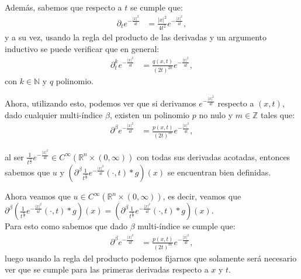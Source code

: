 \documentclass{beamer}
\begin{document}
\begin{frame}
  \begin{block}{}
    Además, sabemos que respecto a $t$ se cumple que:
    \begin{align*}
      \partial_{t}e^{-\frac{|x|^2}{4t}}& = \frac{|x|^{2}}{4t^2} e^{-\frac{|x|^2}{4t}},
    \end{align*}
    y a su vez, usando la regla del producto de las derivadas y un argumento inductivo se puede verificar que en general:
    \begin{align*}
      \partial^{k}_{t}e^{-\frac{|x|^2}{4t}}&=\frac{q(x,t)}{(2t)^{2k}}e^{-\frac{|x|^2}{4t}},
    \end{align*}
    con $k\in \mathbb{N}$ y $q$ polinomio.\\
  \end{block}
\end{frame}

\begin{frame}
  \begin{block}{}
    Ahora, utilizando esto, podemos ver que si derivamos $e^{-\frac{|x|^2}{4t}}$ respecto a $(x,t)$, dado cualquier multi-índice $\beta$, existen un polinomio $p$ no nulo y $m\in \mathbb{Z}$ tales que:
    \begin{align*}
      \partial^{\beta}e^{-\frac{|x|^2}{4t}}&=\frac{p(x,t)}{(2t)^m}e^{-\frac{|x|^2}{4t}},
    \end{align*}
  \end{block}
\end{frame}

\begin{frame}
  \begin{block}{}
    al ser $\frac{1}{t^{\frac{n}{2}}}e^{-\frac{|x|^2}{4t}}\in C^{\infty}(\mathbb{R}^{n}\times(0,\infty))$ con todas sus derivadas acotadas, entonces sabemos que $u$ y $\left( \partial^{\beta}\frac{1}{t^{\frac{n}{2}}}e^{-\frac{|x|^2}{4t}}(\cdot,t)*g \right)(x)$ se encuentran bien definidas.\\
  \end{block}
\end{frame}

\begin{frame}
  \begin{block}{}
    Ahora veamos que $u\in C^{\infty}(\mathbb{R}^{n}\times (0,\infty))$, es decir, veamos que $\partial^{\beta}\left( \frac{1}{t^{\frac{n}{2}}}e^{-\frac{|x|^2}{4t}}(\cdot,t)*g \right)(x)=\left( \partial^{\beta}\frac{1}{t^{\frac{n}{2}}}e^{-\frac{|x|^2}{4t}}(\cdot,t)*g \right)(x)$.\\
    Para esto como sabemos que dado $\beta$ multi-índice se cumple que:
    \begin{align*}
      \partial^{\beta}e^{-\frac{|x|^2}{4t}}&=\frac{p(x,t)}{(2t)^m}e^{-\frac{|x|^2}{4t}}, 
    \end{align*}
    luego usando la regla del producto podemos fijarnos que solamente será necesario ver que se cumple para las primeras derivadas respecto a $x$ y $t$.\\
  \end{block}
\end{frame}
\end{document}
